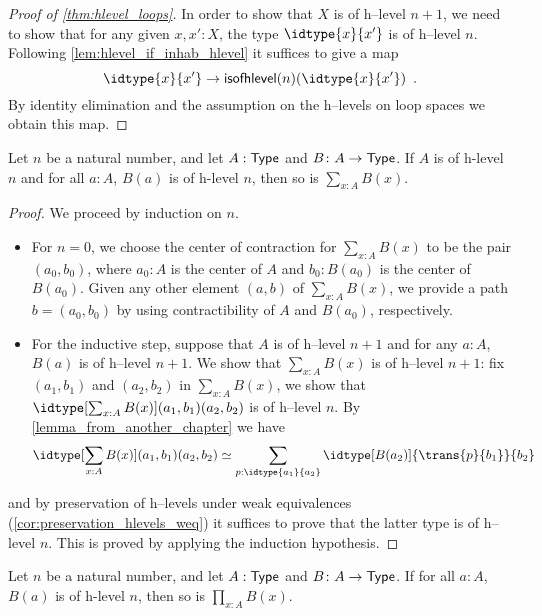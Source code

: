 \begin{proof}[Proof of \autoref{thm:hlevel_loops}]
 In order to show that $X$ is of h--level $n+1$, we need to show that for any given $x, x' : X$, 
   the type $\idtype{x}{x'}$ is of h--level $n$.
  Following \autoref{lem:hlevel_if_inhab_hlevel} it suffices to give a map
   \[ \idtype{x}{x'} \to \isofhlevel(n)(\idtype{x}{x'}) \enspace .\]
  By identity elimination and the assumption on the h--levels on loop spaces we obtain this map.
\end{proof}

\begin{thm}
 Let $n$ be a natural number, and let $A : \mathsf{Type}$ and $B \colon A \to \mathsf{Type}$. 
 If $A$ is of h-level $n$ and for all $a : A$, $B(a)$ is of h-level $n$, then so is $\sum\limits_{x : A} B(x)$.
\end{thm}

\begin{proof}
 We proceed by induction on $n$.
   \begin{itemize}
    \item For $n = 0$, we choose the center of contraction for $\sum_{x : A} B(x)$ to be the pair
       $(a_0, b_0)$, where $a_0 : A$ is the center of $A$ and $b_0 : B(a_0)$ is the center of $B(a_0)$.
       Given any other element $(a,b)$ of $\sum_{x : A} B(x)$, we provide a path $b = (a_0,b_0)$ 
       by using contractibility of $A$ and $B(a_0)$, respectively.
    \item For the inductive step, suppose that $A$ is of h--level $n+1$ and 
         for any $a : A$, $B(a)$ is of h--level $n + 1$. We show that $\sum_{x : A} B(x)$ is 
         of h--level $n + 1$:
      fix $(a_1, b_1)$ and $(a_2,b_2)$ in $\sum_{x : A} B(x)$, 
     we show that $\idtype[\sum_{x : A} B(x)]{(a_1, b_1)}{(a_2,b_2)}$ is of h--level $n$.
      By \autoref{lemma_from_another_chapter} we have
      \[ \idtype[\sum_{x : A} B(x)]{(a_1, b_1)}{(a_2,b_2)} \simeq 
                 \sum_{p : \idtype{a_1}{a_2}} \idtype[B(a_2)]{\trans{p}{b_1}}{b_2} \]
   \end{itemize}
   and by preservation of h--levels under weak equivalences (\autoref{cor:preservation_hlevels_weq})
   it suffices to prove that the latter type is of h--level $n$. This is proved by applying the
   induction hypothesis.
\end{proof}


\begin{thm}
 Let $n$ be a natural number, and let $A : \mathsf{Type}$ and $B \colon A \to \mathsf{Type}$. 
     If for all $a : A$, $B(a)$ is of h-level $n$, then so is $\prod\limits_{x : A} B(x)$.
\end{thm}

